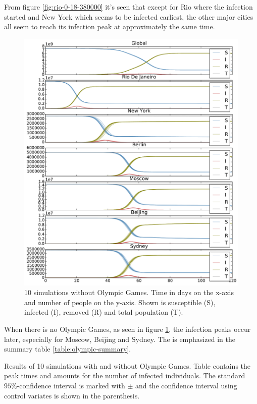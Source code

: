 From figure \ref{fig:rio-0-18-380000} it's seen that except for Rio where the infection started and New York which seems to be infected earliest, the other major cities all seem to reach its infection peak at approximately the same time. 

\begin{figure}[H]
	\centering
	\includegraphics[width=1.0 \linewidth]{plots/no_rio.pdf}
	\caption{10 simulations without Olympic Games. Time in days on the x-axis and number of people on the y-axis. Shown is susceptible (S), infected (I), removed (R) and total population (T).}
	\label{fig:no_rio}
\end{figure}

When there is no Olympic Games, as seen in figure \ref{fig:no_rio}, the infection peaks occur later, especially for Moscow, Beijing and Sydney. The is emphasized in the summary table \ref{table:olympic-summary}.

\begin{table}[H]
	\centering
	
	\caption{Results of 10 simulations with and without Olympic Games. Table contains the peak times and amounts for the number of infected individuals. The standard $95\%$-confidence interval is marked with $\pm$ and the confidence interval using control variates is shown in the parenthesis.}
	\label{table:olympic-summary}
\end{table}

